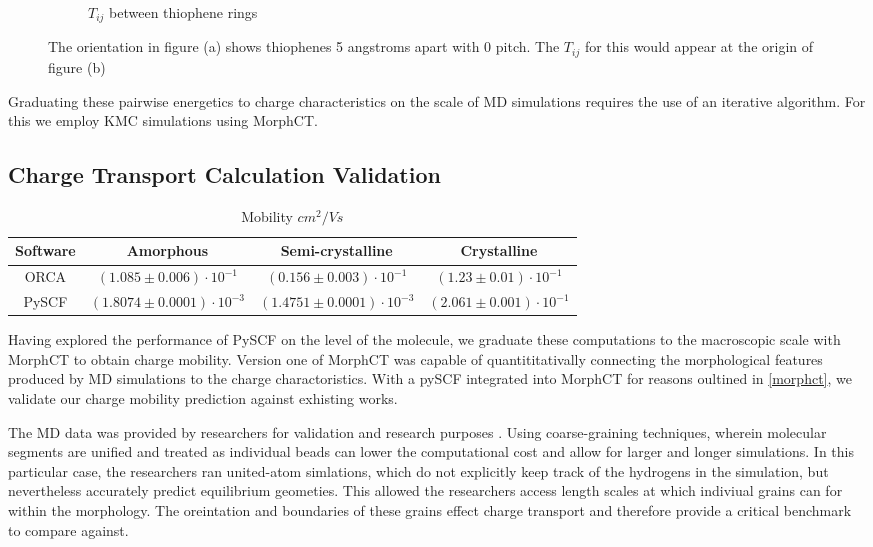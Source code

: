 \begin{figure}[]
\begin{subfigure}{.8\textwidth}
    \caption{$T_{ij}$ between thiophene rings}
\end{subfigure}
    \caption{The orientation in figure (a) shows thiophenes 5 angstroms apart with 0 pitch. The $T_{ij}$ for
    this would appear at the origin of figure (b)}
\label{TIplots}
\end{figure}

Graduating these pairwise energetics to charge characteristics on the scale of MD simulations
requires the use of an iterative algorithm. For this we employ KMC simulations using MorphCT.

\subsection{Charge Transport Calculation Validation}
\label{mobility}
\begin{table}[ht]
    \caption{Mobility $cm^{2}/Vs$} %
\centering %
\begin{tabular}{c c c c} %
\hline\hline %
Software & Amorphous & Semi-crystalline & Crystalline \\ [0.5ex] %
\hline %
    ORCA & $(1.085 \pm 0.006)\cdot 10^{-1}$ & $(0.156 \pm 0.003)\cdot 10^{-1}$ & $(1.23 \pm 0.01)\cdot 10^{-1}$ \\ %
PySCF & $(1.8074 \pm 0.0001)\cdot 10^{-3}$ & $(1.4751 \pm 0.0001)\cdot 10^{-3}$ & $(2.061 \pm 0.001)\cdot 10^{-1}$  \\ [1ex] %
\hline %
\end{tabular}
\label{table:nonlin} %
\end{table}

Having explored the performance of PySCF on the level of the molecule, we graduate these computations to the
macroscopic scale with MorphCT to obtain charge mobility.
Version one of MorphCT was capable of
quantititativally connecting the morphological features produced by MD simulations to the charge
charactoristics. With a pySCF integrated into MorphCT for reasons oultined in \autoref{morphct},
we validate our charge mobility prediction against exhisting works. 

The MD data \cite{P3HTData} was provided by researchers for validation and research purposes \cite{Miller2018}.
Using coarse-graining techniques, 
wherein molecular segments are unified and treated as individual beads 
can lower the computational cost and allow for larger and longer simulations. 
In this particular case, the researchers ran united-atom simlations, which do
not explicitly keep track of the hydrogens in the simulation, 
but nevertheless accurately predict equilibrium geometies. This allowed the researchers access length scales
at which indiviual grains can for within the morphology. The oreintation and boundaries of these grains effect
charge transport and therefore provide a critical benchmark to compare against. 

